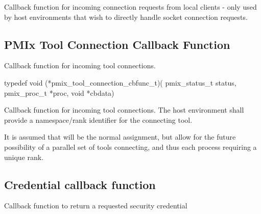 \begin{arglist}
\end{arglist}

\descr

Callback function for incoming connection requests from local clients - only used by host environments that wish to directly handle socket connection requests.


\subsection{PMIx Tool Connection Callback Function}

\summary

Callback function for incoming tool connections.

\format

\cspecificstart
\begin{codepar}
typedef void (*pmix_tool_connection_cbfunc_t)(
                             pmix_status_t status,
                             pmix_proc_t *proc, void *cbdata)
\end{codepar}
\cspecificend

\begin{arglist}
\end{arglist}

\descr

Callback function for incoming tool connections.
The host environment shall provide a namespace/rank identifier for the connecting tool.

\advicermstart
It is assumed that  will be the normal assignment, but allow for the future possibility of a parallel set of tools connecting, and thus each process requiring a unique rank.
\advicermend

\subsection{Credential callback function}

\summary

Callback function to return a requested security credential

